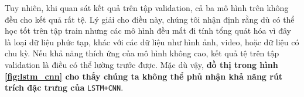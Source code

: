\documentclass[aps,prb,groupedaddress,twocolumn,showpacs,dvipdfmx,superscriptaddress,pdftex]{revtex4-2}
\begin{document}
\vspace{2mm}

Tuy nhiên, khi quan sát kết quả trên tập validation, cả ba mô hình trên không đều cho kết quả rất tệ. Lý giải cho điều này, chúng tôi nhận định rằng dù có thể học tốt trên tập train nhưng các mô hình đều mất đi tính tổng quát hóa vì đây là loại dữ liệu phức tạp, khác với các dữ liệu như hình ảnh, video, hoặc dữ liệu có chu kỳ. Nếu khả năng thích ứng của mô hình không cao, kết quả tệ trên tập validation là điều có thể lường trước được. Mặc dù vậy, \textbf{đồ thị trong hình \ref{fig:lstm_cnn} cho thấy chúng ta không thể phủ nhận khả năng rút trích đặc trưng của} \verb|LSTM+CNN|.


\vspace{2mm}



\end{document}

